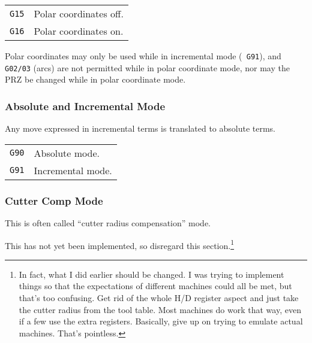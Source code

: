 \documentclass[titlepage,oneside,10pt]{article}
\begin{document}
\vskip 0.25cm
\begin{longtable}{lp{10cm}}
{\tt G15}&Polar coordinates off.\\
{\tt G16}&Polar coordinates on.
\end{longtable}

Polar coordinates may only be used while in incremental mode ({\tt
  G91}), and {\tt G02/03} (arcs) are not permitted while in polar
coordinate mode, nor may the PRZ be changed while in polar coordinate
mode.

\subsubsection{Absolute and Incremental Mode}

Any move expressed in incremental terms is translated to absolute terms.

\vskip 0.25cm
\begin{longtable}{lp{10cm}}
{\tt G90}&Absolute mode.\\
{\tt G91}&Incremental mode.
\end{longtable}

\subsubsection{Cutter Comp Mode}

This is often called ``cutter radius compensation'' mode.

This has not yet been implemented, so disregard this
section.\footnote{In fact, what I did earlier should be changed. I was
trying to implement things so that the expectations of different
machines could all be met, but that's too confusing. Get rid of the
whole H/D register aspect and just take the cutter radius from the
tool table. Most machines do work that way, even if a few use the
extra registers. Basically, give up on trying to emulate actual
machines. That's pointless.}
\end{document}
